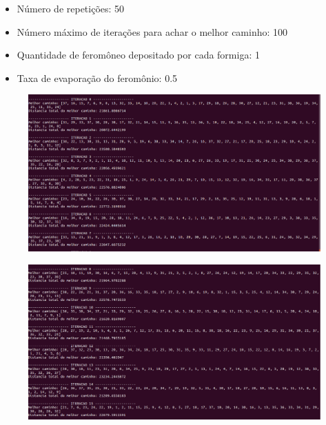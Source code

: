 \documentclass[hidelinks,12pt]{article}
\begin{document}
		 	\begin{itemize}
				\item Número de repetições: 50
				\item Número máximo de iterações para achar o melhor caminho: 100
				\item Quantidade de feromôneo depositado por cada formiga: 1
				\item Taxa de evaporação do feromônio: 0.5
			\end{itemize}

		\newpage

		\begin{figure}[!h]
			\centering
			\includegraphics[scale=0.3]{Figures/m38-1-1.png}
		\end{figure}

		\newpage

		\begin{figure}[!h]
			\centering
			\includegraphics[scale=0.3]{Figures/m38-1-2.png}
		\end{figure}

		\newpage
\end{document}
